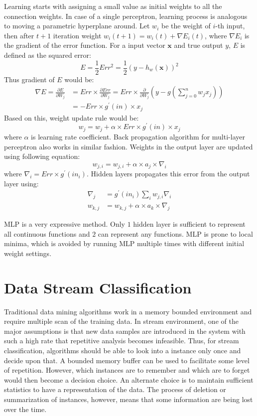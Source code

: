 Learning starts with assigning a small value as initial weights to all the connection weights. In case of a single perceptron, learning process is analogous to moving a parametric hyperplane around. Let $w_i$ be the weight of $i$-th input, then after $t+1$ iteration weight $w_i(t+1) = w_i(t) + \nabla E_i(t)$, where $\nabla E_i$ is the gradient of the error function. For a input vector $\mathbf{x}$ and true output $y$, $E$ is defined as the squared error:
\[
    E = \frac{1}{2} Err^2 = \frac{1}{2} (y - h_w(\mathbf{x}))^2
\]
Thus gradient of $E$ would be:
\begin{align*}
    \nabla E = \frac{\partial E}{\partial W_j} & = Err \times \frac{\partial Err}{\partial W_j} = Err \times \frac{\partial}{\partial W_j} (y - g(\sum_{j=0}^n w_j x_j)) \\
    & = - Err \times g^{\prime} (in) \times x_j
\end{align*}
Based on this, weight update rule would be:
\[
    w_j = w_j + \alpha \times Err \times g^{\prime} (in) \times x_j
\]
where $\alpha$ is learning rate coefficient. Back propagation algorithm for multi-layer perceptron also works in similar fashion. Weights in the output layer are updated using following equation:
\[
    w_{j,i} = w_{j,i} + \alpha \times a_j \times \nabla_i
\]
where $\nabla_i = Err \times g^\prime(in_i)$. Hidden layers propagates this error from the output layer using:
\begin{align*}
    \nabla_j &= g^\prime (in_i) \sum_i w_{j,i} \nabla_i \\
    w_{k, j} &= w_{k, j} + \alpha \times a_k \times \nabla_j
\end{align*}

MLP is a very expressive method. Only $1$ hidden layer is sufficient to represent all continuous functions and $2$ can represent any functions. MLP is prone to local minima, which is avoided by running MLP multiple times with different initial weight settings.

\section{Data Stream Classification}
Traditional data mining algorithms work in a memory bounded environment and require multiple scan of the training data. In stream environment, one of the major assumptions is that new data samples are introduced in the system with such a high rate that repetitive analysis becomes infeasible. Thus, for stream classification, algorithms should be able to look into a instance only once and decide upon that. A bounded memory buffer can be used to facilitate some level of repetition. However, which instances are to remember and which are to forget would then become a decision choice. An alternate choice is to maintain sufficient statistics to have a representation of the data. The process of deletion or summarization of instances, however, means that some information are being lost over the time.

